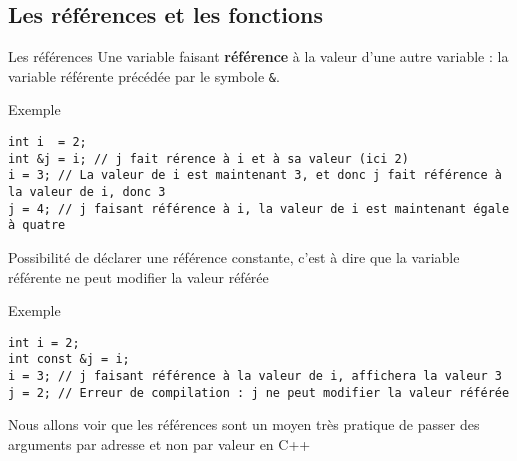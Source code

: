 \documentclass[compress,10pt,aspectratio=169]{beamer}
\begin{document}
\subsection{Les références et les fonctions}

\begin{frame}[fragile]{Les références}
    \scriptsize 
    Une variable faisant \textbf{référence} à la valeur d'une autre variable : 
    la variable référente précédée par le symbole \texttt{\&}.

    \begin{exampleblock}{\small Exemple}
\begin{verbatim}
int i  = 2;
int &j = i; // j fait rérence à i et à sa valeur (ici 2)
i = 3; // La valeur de i est maintenant 3, et donc j fait référence à la valeur de i, donc 3
j = 4; // j faisant référence à i, la valeur de i est maintenant égale à quatre
\end{verbatim}
\end{exampleblock}

Possibilité de déclarer une référence constante, c'est à dire que la variable référente ne peut modifier la valeur référée
\begin{exampleblock}{\small Exemple}
\begin{verbatim}
int i = 2;
int const &j = i;
i = 3; // j faisant référence à la valeur de i, affichera la valeur 3
j = 2; // Erreur de compilation : j ne peut modifier la valeur référée
\end{verbatim}
\end{exampleblock}

Nous allons voir que les références sont un moyen très pratique de passer des arguments par adresse et non par valeur en C++
\end{frame}
\end{document}
